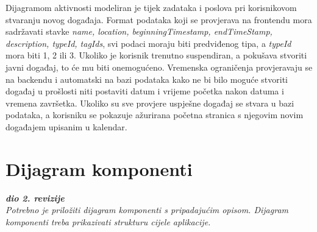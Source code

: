 				\indent Dijagramom aktivnosti modeliran je tijek zadataka i poslova pri korisnikovom stvaranju novog događaja. Format podataka koji se provjerava na frontendu mora sadržavati stavke \textit{name, location, beginningTimestamp, endTimeStamp, description, typeId, tagIds}, svi podaci moraju biti predviđenog tipa, a \textit{typeId} mora biti 1, 2 ili 3. Ukoliko je korisnik trenutno suspendiran, a pokušava stvoriti javni događaj, to će mu biti onemogućeno. Vremenska ograničenja provjeravaju se na backendu i automatski na bazi podataka kako ne bi bilo moguće stvoriti događaj u prošlosti niti postaviti datum i vrijeme početka nakon datuma i vremena završetka. Ukoliko su sve provjere uspješne događaj se stvara u bazi podataka, a korisniku se pokazuje ažurirana početna stranica s njegovim novim događajem upisanim u kalendar.
			
				\eject
				
			\section{Dijagram komponenti}
		
				\textbf{\textit{dio 2. revizije}}\\
		
			 	\textit{Potrebno je priložiti dijagram komponenti s pripadajućim opisom. Dijagram komponenti treba prikazivati strukturu cijele aplikacije.}